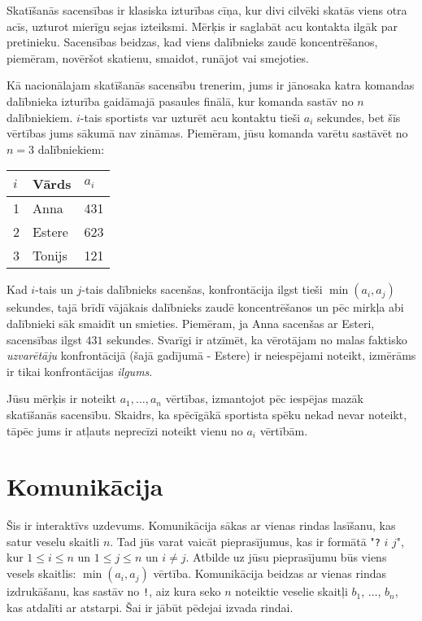 

\noindent
Skatīšanās sacensības ir klasiska izturības cīņa, kur divi cilvēki skatās viens otra acīs, uzturot mierīgu sejas izteiksmi.
Mērķis ir saglabāt acu kontakta ilgāk par pretinieku.
Sacensības beidzas, kad viens dalībnieks zaudē koncentrēšanos, piemēram, novēršot skatienu, smaidot, runājot vai smejoties.

Kā nacionālajam skatīšanās sacensību trenerim, jums ir jānosaka katra komandas dalībnieka izturība gaidāmajā pasaules finālā, kur komanda sastāv no $n$ dalībniekiem.
$i$-tais sportists var uzturēt acu kontaktu tieši $a_i$ sekundes, bet šīs vērtības jums sākumā nav zināmas.
Piemēram, jūsu komanda varētu sastāvēt no $n=3$ dalībniekiem:

\medskip
\begin{tabular}{lll}
  $i$ & Vārds & $a_i$ \\\hline
  1 & Anna &  431 \\
  2 & Estere & 623 \\
  3 & Tonijs &  121\\
\end{tabular}

\medskip
Kad $i$-tais un $j$-tais dalībnieks sacenšas, konfrontācija ilgst tieši $\min(a_i, a_j)$ sekundes, tajā brīdī vājākais dalībnieks zaudē koncentrēšanos un pēc mirkļa abi dalībnieki sāk smaidīt un smieties.
Piemēram, ja Anna sacenšas ar Esteri, sacensības ilgst $431$ sekundes.
Svarīgi ir atzīmēt, ka vērotājam no malas faktisko \emph{uzvarētāju} konfrontācijā (šajā gadījumā - Estere) ir neiespējami noteikt, izmērāms ir tikai konfrontācijas \emph{ilgums}.

Jūsu mērķis ir noteikt $a_1,\ldots, a_n$ vērtības, izmantojot pēc iespējas mazāk skatīšanās sacensību.
Skaidrs, ka spēcīgākā sportista spēku nekad nevar noteikt, tāpēc jums ir atļauts neprecīzi noteikt vienu no $a_i$ vērtībām.


\section*{Komunikācija}

Šis ir interaktīvs uzdevums.
Komunikācija sākas ar vienas rindas lasīšanu, kas satur veselu skaitli $n$.
Tad jūs varat vaicāt pieprasījumus, kas ir formātā "\texttt{?} $i$ $j$", kur $1\leq i\leq n$ un $1\leq j\leq n$ un $i\neq j$.
Atbilde uz jūsu pieprasījumu būs viens vesels skaitlis: $\min(a_i, a_j)$ vērtība.
Komunikācija beidzas ar vienas rindas izdrukāšanu, kas sastāv no \texttt{!}, aiz kura seko $n$ noteiktie veselie skaitļi $b_1$, $\ldots$, $b_n$, kas atdalīti ar atstarpi. Šai ir jābūt pēdejai izvada rindai.

